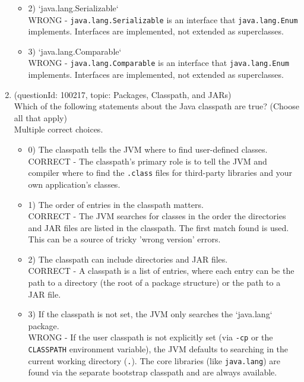 \documentclass[12pt]{article}
\begin{document}
\begin{enumerate}[label=(\arabic*)]
\begin{itemize}
\item 2) `java.lang.Serializable`
 \\ 
WRONG - \verb|java.lang.Serializable| is an interface that \verb|java.lang.Enum| implements. Interfaces are implemented, not extended as superclasses.

\item 3) `java.lang.Comparable`
 \\ 
WRONG - \verb|java.lang.Comparable| is an interface that \verb|java.lang.Enum| implements. Interfaces are implemented, not extended as superclasses.

\end{itemize}
\item (questionId: 100217, topic: Packages, Classpath, and JARs) \\ 
Which of the following statements about the Java classpath are true? (Choose all that apply)
\\ \noindent Multiple correct choices. 
\begin{itemize}
\item 0) The classpath tells the JVM where to find user-defined classes.
 \\ 
CORRECT - The classpath's primary role is to tell the JVM and compiler where to find the \verb|.class| files for third-party libraries and your own application's classes.

\item 1) The order of entries in the classpath matters.
 \\ 
CORRECT - The JVM searches for classes in the order the directories and JAR files are listed in the classpath. The first match found is used. This can be a source of tricky 'wrong version' errors.

\item 2) The classpath can include directories and JAR files.
 \\ 
CORRECT - A classpath is a list of entries, where each entry can be the path to a directory (the root of a package structure) or the path to a JAR file.

\item 3) If the classpath is not set, the JVM only searches the `java.lang` package.
 \\ 
WRONG - If the user classpath is not explicitly set (via \verb|-cp| or the \verb|CLASSPATH| environment variable), the JVM defaults to searching in the current working directory (\verb|.|). The core libraries (like \verb|java.lang|) are found via the separate bootstrap classpath and are always available.


\end{itemize}
\end{enumerate}
\end{document}
